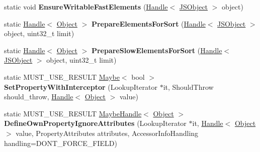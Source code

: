 \begin{DoxyCompactItemize}
\item 
static void {\bfseries Ensure\+Writable\+Fast\+Elements} (\hyperlink{classv8_1_1internal_1_1_handle}{Handle}$<$ \hyperlink{classv8_1_1internal_1_1_j_s_object}{J\+S\+Object} $>$ object)\hypertarget{classv8_1_1internal_1_1_j_s_object_a860fbef55494992879f2417330a6b6fc}{}\label{classv8_1_1internal_1_1_j_s_object_a860fbef55494992879f2417330a6b6fc}

\item 
static \hyperlink{classv8_1_1internal_1_1_handle}{Handle}$<$ \hyperlink{classv8_1_1internal_1_1_object}{Object} $>$ {\bfseries Prepare\+Elements\+For\+Sort} (\hyperlink{classv8_1_1internal_1_1_handle}{Handle}$<$ \hyperlink{classv8_1_1internal_1_1_j_s_object}{J\+S\+Object} $>$ object, uint32\+\_\+t limit)\hypertarget{classv8_1_1internal_1_1_j_s_object_af5e8fe09859ae19736d3f094ee257b1d}{}\label{classv8_1_1internal_1_1_j_s_object_af5e8fe09859ae19736d3f094ee257b1d}

\item 
static \hyperlink{classv8_1_1internal_1_1_handle}{Handle}$<$ \hyperlink{classv8_1_1internal_1_1_object}{Object} $>$ {\bfseries Prepare\+Slow\+Elements\+For\+Sort} (\hyperlink{classv8_1_1internal_1_1_handle}{Handle}$<$ \hyperlink{classv8_1_1internal_1_1_j_s_object}{J\+S\+Object} $>$ object, uint32\+\_\+t limit)\hypertarget{classv8_1_1internal_1_1_j_s_object_a71148c3cb12a09ef75a00b556fac638f}{}\label{classv8_1_1internal_1_1_j_s_object_a71148c3cb12a09ef75a00b556fac638f}

\item 
static M\+U\+S\+T\+\_\+\+U\+S\+E\+\_\+\+R\+E\+S\+U\+LT \hyperlink{classv8_1_1_maybe}{Maybe}$<$ bool $>$ {\bfseries Set\+Property\+With\+Interceptor} (Lookup\+Iterator $\ast$it, Should\+Throw should\+\_\+throw, \hyperlink{classv8_1_1internal_1_1_handle}{Handle}$<$ \hyperlink{classv8_1_1internal_1_1_object}{Object} $>$ value)\hypertarget{classv8_1_1internal_1_1_j_s_object_a5582b53f7d7c5abab535b4b65663d48a}{}\label{classv8_1_1internal_1_1_j_s_object_a5582b53f7d7c5abab535b4b65663d48a}

\item 
static M\+U\+S\+T\+\_\+\+U\+S\+E\+\_\+\+R\+E\+S\+U\+LT \hyperlink{classv8_1_1internal_1_1_maybe_handle}{Maybe\+Handle}$<$ \hyperlink{classv8_1_1internal_1_1_object}{Object} $>$ {\bfseries Define\+Own\+Property\+Ignore\+Attributes} (Lookup\+Iterator $\ast$it, \hyperlink{classv8_1_1internal_1_1_handle}{Handle}$<$ \hyperlink{classv8_1_1internal_1_1_object}{Object} $>$ value, Property\+Attributes attributes, Accessor\+Info\+Handling handling=D\+O\+N\+T\+\_\+\+F\+O\+R\+C\+E\+\_\+\+F\+I\+E\+LD)\hypertarget{classv8_1_1internal_1_1_j_s_object_a7be0a80a7b622e42791a8f8b28db7ec9}{}\label{classv8_1_1internal_1_1_j_s_object_a7be0a80a7b622e42791a8f8b28db7ec9}


\end{DoxyCompactItemize}
